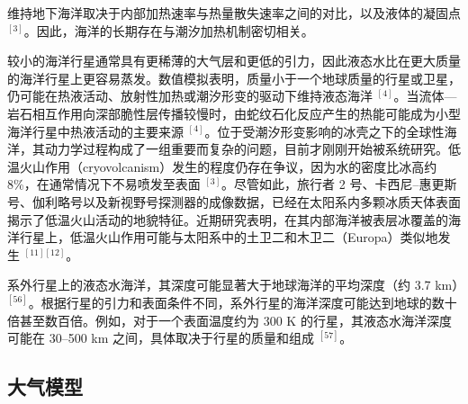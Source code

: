 维持地下海洋取决于内部加热速率与热量散失速率之间的对比，以及液体的凝固点 $^{[3]}$。因此，海洋的长期存在与潮汐加热机制密切相关。

较小的海洋行星通常具有更稀薄的大气层和更低的引力，因此液态水比在更大质量的海洋行星上更容易蒸发。数值模拟表明，质量小于一个地球质量的行星或卫星，仍可能在热液活动、放射性加热或潮汐形变的驱动下维持液态海洋 $^{[4]}$。当流体—岩石相互作用向深部脆性层传播较慢时，由蛇纹石化反应产生的热能可能成为小型海洋行星中热液活动的主要来源 $^{[4]}$。位于受潮汐形变影响的冰壳之下的全球性海洋，其动力学过程构成了一组重要而复杂的问题，目前才刚刚开始被系统研究。低温火山作用（cryovolcanism）发生的程度仍存在争议，因为水的密度比冰高约 8\%，在通常情况下不易喷发至表面 $^{[3]}$。尽管如此，旅行者 2 号、卡西尼–惠更斯号、伽利略号以及新视野号探测器的成像数据，已经在太阳系内多颗冰质天体表面揭示了低温火山活动的地貌特征。近期研究表明，在其内部海洋被表层冰覆盖的海洋行星上，低温火山作用可能与太阳系中的土卫二和木卫二（Europa）类似地发生 $^{[11][12]}$。

系外行星上的液态水海洋，其深度可能显著大于地球海洋的平均深度（约 3.7 km）$^{[56]}$。根据行星的引力和表面条件不同，系外行星的海洋深度可能达到地球的数十倍甚至数百倍。例如，对于一个表面温度约为 300 K 的行星，其液态水海洋深度可能在 30–500 km 之间，具体取决于行星的质量和组成 $^{[57]}$。
\subsection{大气模型}
